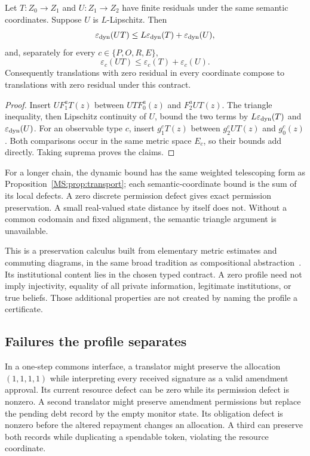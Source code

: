 \begin{MStheorem}\label{MS:thm:residual}
Let $T:Z_0\to Z_1$ and $U:Z_1\to Z_2$ have finite residuals under the same semantic coordinates. Suppose $U$ is $L$-Lipschitz. Then
\[
\varepsilon_{\rm dyn}(UT)
\leq L\varepsilon_{\rm dyn}(T)+\varepsilon_{\rm dyn}(U),
\]
and, separately for every $c\in\{P,O,R,E\}$,
\[
\varepsilon_c(UT)\leq\varepsilon_c(T)+\varepsilon_c(U).
\]
Consequently translations with zero residual in every coordinate compose to translations with zero residual under this contract.
\end{MStheorem}
\begin{proof}
Insert $UF_1^aT(z)$ between $UTF_0^a(z)$ and $F_2^aUT(z)$. The triangle inequality, then Lipschitz continuity of $U$, bound the two terms by $L\varepsilon_{\rm dyn}(T)$ and $\varepsilon_{\rm dyn}(U)$. For an observable type $c$, insert $g_1^cT(z)$ between $g_2^cUT(z)$ and $g_0^c(z)$. Both comparisons occur in the same metric space $E_c$, so their bounds add directly. Taking suprema proves the claims.
\end{proof}

For a longer chain, the dynamic bound has the same weighted telescoping form as Proposition~\ref{MS:prop:transport}; each semantic-coordinate bound is the sum of its local defects. A zero discrete permission defect gives exact permission preservation. A small real-valued state distance by itself does not. Without a common codomain and fixed alignment, the semantic triangle argument is unavailable.

This is a preservation calculus built from elementary metric estimates and commuting diagrams, in the same broad tradition as compositional abstraction~\cite{MS:rischel}. Its institutional content lies in the chosen typed contract. A zero profile need not imply injectivity, equality of all private information, legitimate institutions, or true beliefs. Those additional properties are not created by naming the profile a certificate.

\subsection{Failures the profile separates}
In a one-step commons interface, a translator might preserve the allocation $(1,1,1,1)$ while interpreting every received signature as a valid amendment approval. Its current resource defect can be zero while its permission defect is nonzero. A second translator might preserve amendment permissions but replace the pending debt record by the empty monitor state. Its obligation defect is nonzero before the altered repayment changes an allocation. A third can preserve both records while duplicating a spendable token, violating the resource coordinate.

